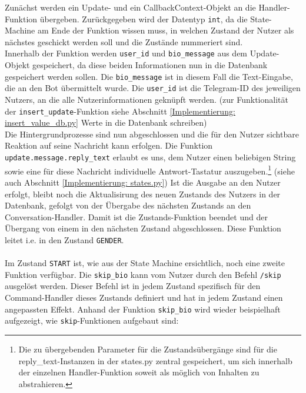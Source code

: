             Zunächst werden ein Update- und ein CallbackContext-Objekt an die Handler-Funktion übergeben. Zurückgegeben wird der Datentyp \verb|int|, da die State-Machine am Ende der Funktion wissen muss, in welchen Zustand der Nutzer als nächstes geschickt werden soll und die Zustände nummeriert sind. \\
            Innerhalb der Funktion werden \verb|user_id| und \verb|bio_message| aus dem Update-Objekt gespeichert, da diese beiden Informationen nun in die Datenbank gespeichert werden sollen. Die \verb|bio_message| ist in diesem Fall die Text-Eingabe, die an den Bot übermittelt wurde. Die \verb|user_id| ist die Telegram-ID des jeweiligen Nutzers, an die alle Nutzerinformationen geknüpft werden.
            (zur Funktionalität der \verb|insert_update|-Funktion siehe Abschnitt \ref{Implementierung: insert_value_db.py} Werte in die Datenbank schreiben)\\
            Die Hintergrundprozesse sind nun abgeschlossen und die für den Nutzer sichtbare Reaktion auf seine Nachricht kann erfolgen. Die Funktion \verb|update.message.reply_text| erlaubt es uns, dem Nutzer einen beliebigen String sowie eine für diese Nachricht individuelle Antwort-Tastatur auszugeben.\footnote{Die zu übergebenden Parameter für die Zustandsübergänge sind für die reply\_text-Instanzen in der states.py zentral gespeichert, um sich innerhalb der einzelnen Handler-Funktion soweit als möglich von Inhalten zu abstrahieren.} (siehe auch Abschnitt \ref*{Implementierung: states.py})
            Ist die Ausgabe an den Nutzer erfolgt, bleibt noch die Aktualisirung des neuen Zustands des Nutzers in der Datenbank, gefolgt von der Übergabe des nächsten Zustands an den Conversation-Handler. Damit ist die Zustands-Funktion beendet und der Übergang von einem in den nächsten Zustand abgeschlossen. Diese Funktion leitet i.e. in den Zustand \verb|GENDER|.\\ \\

            Im Zustand \verb|START| ist, wie aus der State Machine ersichtlich, noch eine zweite Funktion verfügbar. Die \verb|skip_bio| kann vom Nutzer durch den Befehl \verb|/skip| ausgelöst werden. Dieser Befehl ist in jedem Zustand spezifisch für den Command-Handler dieses Zustands definiert und hat in jedem Zustand einen angepassten Effekt. Anhand der Funktion \verb|skip_bio| wird wieder beispielhaft aufgezeigt, wie \verb|skip|-Funktionen aufgebaut sind:

